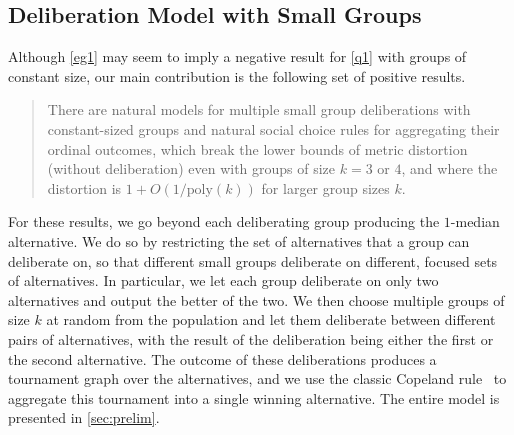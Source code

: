 \subsection{Deliberation Model with Small Groups}  %
Although \cref{eg1} may seem to imply a negative result for \cref{q1} with groups of constant size, our main contribution is the following set of positive results.

\begin{quote}
There are natural models for multiple small group deliberations with constant-sized groups and natural social choice rules for aggregating their ordinal outcomes, which break the lower bounds of metric distortion (without deliberation) even with groups of size $k = 3$ or $4$, and where the distortion is $1 + O(1/\mbox{poly}(k))$ for larger group sizes $k$.
\end{quote}

For these results, we go beyond each deliberating group producing the $1$-median alternative. We do so by restricting the set of alternatives that a group can deliberate on, so that different small groups deliberate on different, focused sets of alternatives. In particular, we let each group deliberate on only two alternatives and output the better of the two. We then choose multiple groups of size $k$ at random from the population and let them deliberate between different pairs of alternatives, with the result of the deliberation being either the first or the second alternative. %
The outcome of these deliberations produces a tournament graph over the alternatives,  and we use the classic Copeland rule~\cite{voting-book} to aggregate this tournament into a single winning alternative. The entire model is presented in \cref{sec:prelim}.

